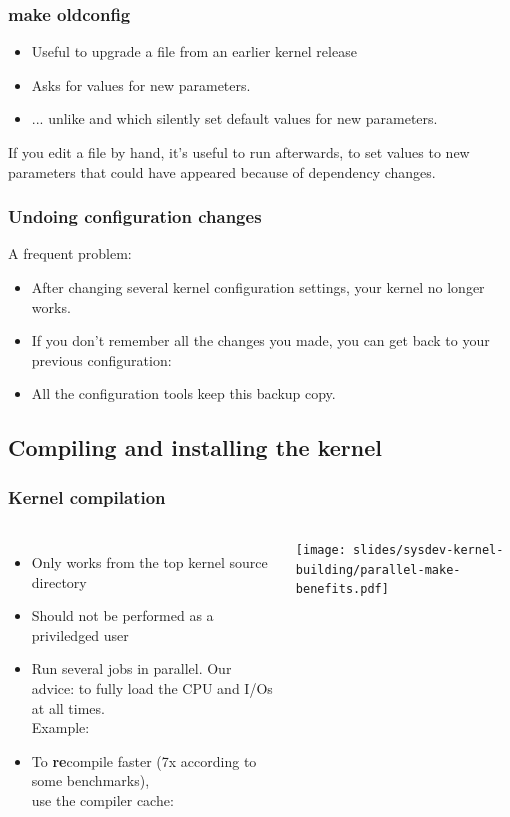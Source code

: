 \begin{frame}
  \frametitle{make oldconfig}
  \begin{itemize}
  \item Useful to upgrade a  file from an earlier kernel release
  \item Asks for values for new parameters.
  \item ... unlike  and  which silently set
  default values for new parameters.
  \end{itemize}
  If you edit a  file by hand, it's useful
  to run  afterwards, to set values to new
  parameters that could have appeared because of dependency changes.
\end{frame}

\begin{frame}
  \frametitle{Undoing configuration changes}
  A frequent problem:
  \begin{itemize}
  \item After changing several kernel configuration settings, your
    kernel no longer works.
  \item If you don't remember all the changes you made,
    you can get back to your previous configuration:\\
  \item All the configuration tools keep this  backup
    copy.
  \end{itemize}
\end{frame}

\subsection{Compiling and installing the kernel}

\begin{frame}[fragile]
  \frametitle{Kernel compilation}
  \begin{columns}
  \begin{itemize}
    \item Only works from the top kernel source directory
    \item Should not be performed as a priviledged user
    \item Run several jobs in parallel. Our advice:  to
      fully load the CPU and I/Os at all times.\\
          Example: 
    \item To {\bf re}compile faster (7x according to some benchmarks),\\
	  use the  compiler cache:\\
  \end{itemize}
    \texttt{[image: slides/sysdev-kernel-building/parallel-make-benefits.pdf]}
  \end{columns}
\end{frame}

